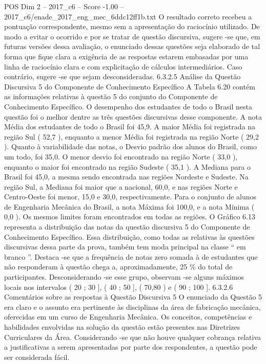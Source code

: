 \begin{textsample}{POS Dim 2 – 2017\_c6 – Score -1.00 – 2017\_c6/enade\_2017\_eng\_mec\_6ddc12ff1b.txt}
O resultado correto recebeu a pontuação correspondente, mesmo sem a apresentação do raciocínio utilizado.
De modo a evitar o ocorrido e por se tratar de questão discursiva, sugere -se que, em futuras versões dessa avaliação, o enunciado dessas questões seja elaborado de tal forma que fique clara a exigência de as respostas estarem embasadas por uma linha de raciocínio clara e com explicitação de cálculos intermediários.
Caso contrário, sugere -se que sejam desconsideradas. 6.3.2.5 Análise da Questão Discursiva 5 do Componente de Conhecimento Específico A Tabela 6.20 contém as informações relativas à questão 5 do conjunto do Componente de Conhecimento Específico.
O desempenho dos estudantes de todo o Brasil nesta questão foi o melhor dentre as três questões discursivas desse componente.
A nota Média dos estudantes de todo o Brasil foi 45,9.
A maior Média foi registrada na região Sul ( 52,7 ), enquanto a menor Média foi registrada na região Norte ( 29,2 ).
Quanto à variabilidade das notas, o Desvio padrão dos alunos do Brasil, como um todo, foi 35,0.
O menor desvio foi encontrado na região Norte ( 33,0 ), enquanto o maior foi encontrado na região Sudeste ( 35,1 ).
A Mediana para o Brasil foi 45,0, a mesma sendo encontrada nas regiões Nordeste e Sudeste.
Na região Sul, a Mediana foi maior que a nacional, 60,0, e nas regiões Norte e Centro-Oeste foi menor, 15,0 e 30,0, respectivamente.
Para o conjunto de alunos de Engenharia Mecânica do Brasil, a nota Máxima foi 100,0, e a nota Mínima ( 0,0 ).
Os mesmos limites foram encontrados em todas as regiões.
O Gráfico 6.13 representa a distribuição das notas da questão discursiva 5 do Componente de Conhecimento Específico.
Essa distribuição, como todas as relativas às questões discursivas dessa parte da prova, também tem moda principal na classe “ em branco ”.
Destaca -se que a frequência de notas zero somada à de estudantes que não responderam à questão chega a, aproximadamente, 25 \% do total de participantes.
Desconsiderando -se esse grupo, observam -se alguns máximos locais nos intervalos ( 20 ; 30 ], ( 40 ; 50 ], ( 70,80 ) e ( 90 ; 100 ]. 6.3.2.6 Comentários sobre as respostas à Questão Discursiva 5 O enunciado da Questão 5 era claro e o assunto era pertinente às disciplinas da área de fabricação mecânica, oferecidas em um curso de Engenharia Mecânica.
Os conceitos, competências e habilidades envolvidas na solução da questão estão presentes nas Diretrizes Curriculares da Área.
Considerando -se que não houve qualquer cobrança relativa a justificativas a serem apresentadas por parte dos respondentes, a questão pode ser considerada fácil.

\end{textsample}
